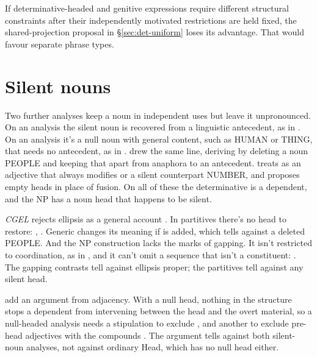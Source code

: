 \documentclass[12pt]{article}
\begin{document}
If determinative-headed and genitive expressions require different structural constraints after their independently motivated restrictions are held fixed, the shared-projection proposal in §\ref{sec:det-uniform} loses its advantage. That would favour separate phrase types.

\section{Silent nouns}\label{sec:ellipsis}

Two further analyses keep a noun in independent uses but leave it unpronounced. On an  analysis the silent noun is recovered from a linguistic antecedent, as in . On an  analysis it's a null noun with general content, such as HUMAN or THING, that needs no antecedent, as in  \citep{panagiotidis2003empty,saab2019nominal}. \textcite[174--175]{pullum1975people} drew the same line, deriving  by deleting a noun PEOPLE and keeping that apart from anaphora to an antecedent. \textcite{kayne2007several} treats  as an adjective that always modifies  or a silent counterpart NUMBER, and \textcite{aarts2024fused} proposes empty heads in place of fusion. On all of these the determinative is a dependent, and the NP has a noun head that happens to be silent.

\textit{CGEL} rejects ellipsis as a general account \citep[420--421]{huddleston2002}. In partitives there's no head to restore: , . Generic  changes its meaning if  is added, which tells against a deleted PEOPLE. And the NP construction lacks the marks of gapping. It isn't restricted to coordination, as in , and it can't omit a sequence that isn't a constituent: . The gapping contrasts tell against ellipsis proper; the partitives tell against any silent head.

\textcite[571 n.~5]{Payne2007} add an argument from adjacency. With a null head, nothing in the structure stops a dependent from intervening between the head and the overt material, so a null-headed analysis needs a stipulation to exclude  \citep[589]{Payne2007}, and another to exclude pre-head adjectives with the compounds \citep[584]{Payne2007}. The argument tells against both silent-noun analyses, not against ordinary Head, which has no null head either.
\end{document}
